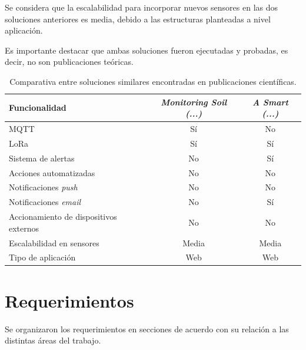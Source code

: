 Se considera que la escalabilidad para incorporar nuevos sensores en las dos soluciones anteriores es media, debido a las estructuras planteadas a nivel aplicación. 

Es importante destacar que ambas soluciones fueron ejecutadas y probadas, es decir, no son publicaciones teóricas. 

\begin{table}[H]
	\centering
	\caption[Comparativa entre soluciones similares encontradas en publicaciones científicas]{Comparativa entre soluciones similares encontradas en publicaciones científicas.}
	\begin{tabular}{l c c}    
		\toprule
		\textbf{Funcionalidad} & \textbf{\textit{Monitoring Soil (...)}} & \textbf{\textit{A Smart (...)}}  \\
		\midrule
		MQTT & Sí & No  \\
		LoRa & Sí & Sí  \\
		Sistema de alertas & No & Sí \\
		Acciones automatizadas & No & No \\
		Notificaciones \emph{push} & No & No \\
		Notificaciones \textit{email} & No & Sí \\
		Accionamiento de dispositivos externos & No & No \\
		Escalabilidad en sensores & Media & Media \\
		Tipo de aplicación & Web & Web \\
		\bottomrule
		\hline
	\end{tabular}
	\label{tab:comparativaSolucionesPublicacionesCientificas}
\end{table}


\section{Requerimientos}

Se organizaron los requerimientos en secciones de acuerdo con su relación a las distintas áreas del trabajo.

